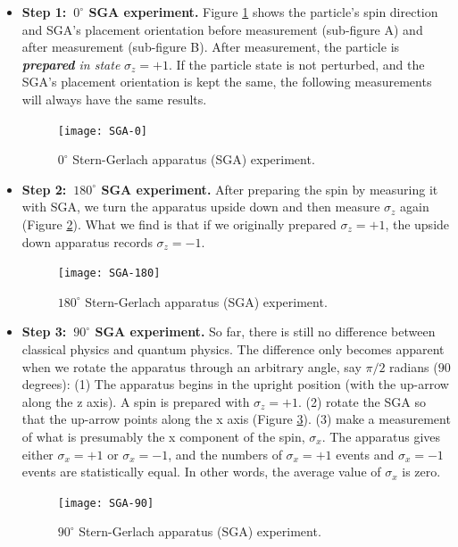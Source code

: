 \documentclass{easyclass}
\begin{document}
\begin{itemize}
	\item \textbf{Step 1:\ $0^{\circ}$ SGA experiment.} Figure \ref{fig:SGA-0} shows the particle's spin direction and SGA's placement orientation before measurement (sub-figure A) and after measurement (sub-figure B). After measurement, the particle is \textit{\textbf{prepared} in state} $\sigma_z = +1$. If the particle state is not perturbed, and the SGA's placement orientation is kept the same, the following measurements will always have the same results.
	
	\begin{figure}[h]
		\centering
		\texttt{[image: SGA-0]}
		\caption{$0^{\circ}$ Stern-Gerlach apparatus (SGA) experiment.}
		\label{fig:SGA-0}
	\end{figure}
	
	\item \textbf{Step 2:\ $180^{\circ}$ SGA experiment.} After preparing the spin by measuring it with SGA, we turn the apparatus upside down and then measure $\sigma_z$ again (Figure \ref{fig:SGA-180}). What we find is that if
	we originally prepared $\sigma_z = +1$, the upside down apparatus records $\sigma_z = -1$. 
	
	\begin{figure}[h]
		\centering
		\texttt{[image: SGA-180]}
		\caption{$180^{\circ}$ Stern-Gerlach apparatus (SGA) experiment.}
		\label{fig:SGA-180}
	\end{figure}
	
	\item \textbf{Step 3:\ $90^{\circ}$ SGA experiment.} So far, there is still no difference between classical physics and quantum physics. The difference only becomes apparent
	when we rotate the apparatus through an arbitrary angle, say $\pi/2$ radians ($90$ degrees):
	(1) The apparatus begins in the upright position (with the up-arrow along the z axis). A
	spin is prepared with $\sigma_z = +1$. (2) rotate the SGA so that the up-arrow points along the x axis (Figure \ref{fig:SGA-90}). (3) make a measurement of what is presumably the x component of the spin, $\sigma_x$. The apparatus gives either $\sigma_x = +1$ or $\sigma_x = −1$, and the numbers of $\sigma_x = +1$ events and $\sigma_x = −1$ events
	are statistically equal. In other words, the average value of $\sigma_x$ is zero. 
	
	\begin{figure}[h]
		\centering
		\texttt{[image: SGA-90]}
		\caption{$90^{\circ}$ Stern-Gerlach apparatus (SGA) experiment.}
		\label{fig:SGA-90}
	\end{figure}
	

\end{itemize}
\end{document}
